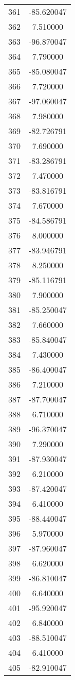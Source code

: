 \documentclass[12pt]{article}
\begin{document}
\begin{longtable}{@{}cc@{}}
361 & -85.620047 \\
362 & 7.510000 \\
363 & -96.870047 \\
364 & 7.790000 \\
365 & -85.080047 \\
366 & 7.720000 \\
367 & -97.060047 \\
368 & 7.980000 \\
369 & -82.726791 \\
370 & 7.690000 \\
371 & -83.286791 \\
372 & 7.470000 \\
373 & -83.816791 \\
374 & 7.670000 \\
375 & -84.586791 \\
376 & 8.000000 \\
377 & -83.946791 \\
378 & 8.250000 \\
379 & -85.116791 \\
380 & 7.900000 \\
381 & -85.250047 \\
382 & 7.660000 \\
383 & -85.840047 \\
384 & 7.430000 \\
385 & -86.400047 \\
386 & 7.210000 \\
387 & -87.700047 \\
388 & 6.710000 \\
389 & -96.370047 \\
390 & 7.290000 \\
391 & -87.930047 \\
392 & 6.210000 \\
393 & -87.420047 \\
394 & 6.410000 \\
395 & -88.440047 \\
396 & 5.970000 \\
397 & -87.960047 \\
398 & 6.620000 \\
399 & -86.810047 \\
400 & 6.640000 \\
401 & -95.920047 \\
402 & 6.840000 \\
403 & -88.510047 \\
404 & 6.410000 \\
405 & -82.910047 \\

\end{longtable}
\end{document}
